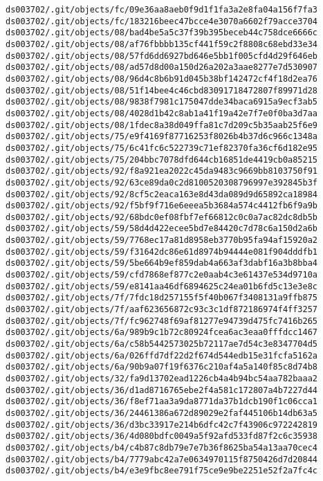 \documentclass[11pt]{article}
\begin{document}
\begin{Verbatim}[commandchars=\\\{\}]
ds003702/.git/objects/fc/09e36aa8aeb0f9d1f1fa3a2e8fa04a156f7fa3
ds003702/.git/objects/fc/183216beec47bcce4e3070a6602f79acce3704
ds003702/.git/objects/08/bad4be5a5c37f39b395beceb44c758dce6666c
ds003702/.git/objects/08/af76fbbbb135cf441f59c2f8808c68ebd33e34
ds003702/.git/objects/08/57fd6dd6927bd646e5bb1f005cfd4d29f646eb
ds003702/.git/objects/08/ad57d8d00a150d26a202a3aae8277e7d530907
ds003702/.git/objects/08/96d4c8b6b91d045b38bf142472cf4f18d2ea76
ds003702/.git/objects/08/51f14bee4c46cbd83091718472807f89971d28
ds003702/.git/objects/08/9838f7981c175047dde34baca6915a9ecf3ab5
ds003702/.git/objects/08/4028d1b42c8ab1a41f19a42e7f7e0f0ba3d7aa
ds003702/.git/objects/08/1fdec8a38d049ffa81c7d209c5b35aab25f6e9
ds003702/.git/objects/75/e9f4169f87716253f8026b4b37d6c966c1348a
ds003702/.git/objects/75/6c41fc6c522739c71ef82370fa36cf6d182e95
ds003702/.git/objects/75/204bbc7078dfd644cb16851de4419cb0a85215
ds003702/.git/objects/92/f8a921ea2022c45da9483c9669bb8103750f91
ds003702/.git/objects/92/63ce89da0c2d8100520308796997e392845b3f
ds003702/.git/objects/92/8cf5c2eaca163e8d43da089d9d65892ca18984
ds003702/.git/objects/92/f5bf9f716e6eeea5b3684a574c4412fb6f9a9b
ds003702/.git/objects/92/68bdc0ef08fbf7ef66812c0c0a7ac82dc8db5b
ds003702/.git/objects/59/58d4d422ecee5bd7e84420c7d78c6a150d2a6b
ds003702/.git/objects/59/7768ec17a81d8958eb3770b95fa94af15920a2
ds003702/.git/objects/59/f31642dc86e61d8974b94444e081f904dddfb1
ds003702/.git/objects/59/5be664b9ef859dab4a663af3dabf16a3b8bba4
ds003702/.git/objects/59/cfd7868ef877c2e0aab4c3e61437e534d9710a
ds003702/.git/objects/59/e8141aa46df6894625c24ea01b6fd5c13e3e8c
ds003702/.git/objects/7f/7fdc18d257155f5f40b067f3408131a9ffb875
ds003702/.git/objects/7f/aaf623656872c93c3c1df872186974f4ff3257
ds003702/.git/objects/7f/fc962748f69af81277e94739d475fc7416b265
ds003702/.git/objects/6a/989b9c1b72c80924fcea6ac3eaa0fffdcc1467
ds003702/.git/objects/6a/c58b5442573025b72117ae7d54c3e8347704d5
ds003702/.git/objects/6a/026ffd7df22d2f674d544edb15e31fcfa5162a
ds003702/.git/objects/6a/90b9a07f19f6376c210af4a5a140f85c8d74b8
ds003702/.git/objects/32/fa9d13702ead1226cb4a4b94bc54aa782baaa2
ds003702/.git/objects/36/d1ad8716765ebe2f4a581c172807a4b7227d44
ds003702/.git/objects/36/f8ef71aa3a9da8771da37b1dcb190f1c06cca1
ds003702/.git/objects/36/24461386a672d89029e2faf445106b14db63a5
ds003702/.git/objects/36/d3bc33917e214b6dfc42c7f43906c972242819
ds003702/.git/objects/36/4d080bdfc0049a5f92afd533fd87f2c6c35938
ds003702/.git/objects/b4/c4b87c8db79e7e7b36f8625ba54a13aa70cec4
ds003702/.git/objects/b4/7779abc42a7e0634970115f8750426d7d20844
ds003702/.git/objects/b4/e3e9fbc8ee791f75ce9e9be2251e52f2a7fc4c

\end{Verbatim}
\end{document}
